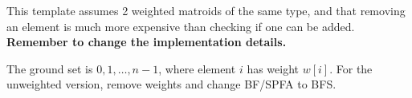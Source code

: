 This template assumes 2 weighted matroids of the same type, and that removing
an element is much more expensive than checking if one can be added.
\textbf{Remember to change the implementation details.}

The ground set is $0, 1, \dots, n - 1$, where element $i$ has weight $w[i]$.
For the unweighted version, remove weights and change BF/SPFA to BFS.
